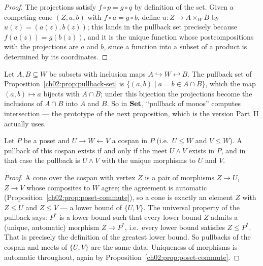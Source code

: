 \begin{proof}
The projections satisfy $f \circ p = g \circ q$ by definition of the
set. Given a competing cone $(Z, a, b)$ with $f \circ a = g \circ b$,
define $u : Z \to A \times_W B$ by $u(z) = (a(z), b(z))$; this lands
in the pullback set precisely because $f(a(z)) = g(b(z))$, and it is
the unique function whose postcompositions with the projections are
$a$ and $b$, since a function into a subset of a product is determined
by its coordinates.
\end{proof}

\begin{example}\label{ch02:ex:pullback-subsets}
Let $A, B \subseteq W$ be subsets with inclusion maps
$A \hookrightarrow W \hookleftarrow B$. The pullback set of
Proposition~\ref{ch02:prop:pullback-set} is
$\{(a, b) \mid a = b \in A \cap B\}$, which the map
$(a,b) \mapsto a$ bijects with $A \cap B$; under this bijection the
projections become the inclusions of $A \cap B$ into $A$ and $B$. So
in $\mathbf{Set}$, ``pullback of monos'' computes intersection --- the
prototype of the next proposition, which is the version Part~II
actually uses.
\end{example}

\begin{proposition}\label{ch02:prop:pullback-poset}
Let $P$ be a poset and $U \to W \leftarrow V$ a cospan in $P$ (i.e.\
$U \le W$ and $V \le W$). A pullback of this cospan exists if and only
if the meet $U \wedge V$ exists in $P$, and in that case the pullback
is $U \wedge V$ with the unique morphisms to $U$ and $V$.
\end{proposition}

\begin{proof}
A cone over the cospan with vertex $Z$ is a pair of morphisms
$Z \to U$, $Z \to V$ whose composites to $W$ agree; the agreement is
automatic (Proposition~\ref{ch02:prop:poset-commute}), so a cone is
exactly an element $Z$ with $Z \le U$ and $Z \le V$ --- a lower bound
of $\{U, V\}$. The universal property of the pullback says: $P^*$ is a
lower bound such that every lower bound $Z$ admits a (unique,
automatic) morphism $Z \to P^*$, i.e.\ every lower bound satisfies
$Z \le P^*$. That is precisely the definition of the greatest lower
bound. So pullbacks of the cospan and meets of $\{U, V\}$ are the same
data. Uniqueness of morphisms is automatic throughout, again by
Proposition~\ref{ch02:prop:poset-commute}.
\end{proof}

